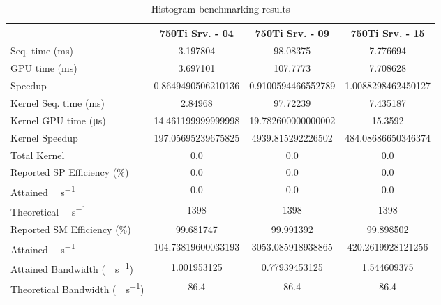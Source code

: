 \begin{table}[H]
	\centering
	\caption{Histogram benchmarking results}
	\label{tab:histogram-results}
	\begin{tabular}{lS[table-format=7.1]S[table-format=7.1]S[table-format=7.1]}
		\toprule
			~ & {\textbf{750Ti Srv. - 04}} & {\textbf{750Ti Srv. - 09}} & {\textbf{750Ti Srv. - 15}} \\
		\midrule
			{Seq. time (\si{\milli\second})} & 3.197804 & 98.08375 & 7.776694 \\
			{GPU time (\si{\milli\second})} & 3.697101 & 107.7773 & 7.708628 \\
			{Speedup} & 0.8649490506210136 &0.9100594466552789 & 1.0088298462450127 \\
		\midrule
			{Kernel Seq. time (\si{\milli\second})} & 2.84968 & 97.72239 & 7.435187 \\
			{Kernel GPU time (\si{\micro\second})} & 14.461199999999998 & 19.782600000000002 & 15.3592 \\
			{Kernel Speedup} & 197.05695239675825 & 4939.815292226502 & 484.08686650346374 \\
		\midrule
			{Total Kernel \si{\mega\flops}} & 0.0 & 0.0 & 0.0 \\
			{Reported SP Efficiency (\si{\percent})} & 0.0 & 0.0 & 0.0 \\
			{Attained \si{\giga\flops\per\second}} & 0.0 & 0.0 & 0.0 \\
			{Theoretical \si{\giga\flops\per\second}} & 1398 & 1398 & 1398 \\
		\midrule
			{Reported SM Efficiency (\si{\percent})} & 99.681747 & 99.991392 & 99.898502 \\
			{Attained \si{\giga\iops\per\second}} & 104.73819600033193 & 3053.085918938865 & 420.2619928121256 \\			
		\midrule
			{Attained Bandwidth (\si{\giga\byte\per\second})} & 1.001953125 & 0.77939453125  & 1.544609375 \\
			{Theoretical Bandwidth (\si{\giga\byte\per\second})}	& 86.4 & 86.4 & 86.4 \\
		\bottomrule
	\end{tabular}
\end{table}